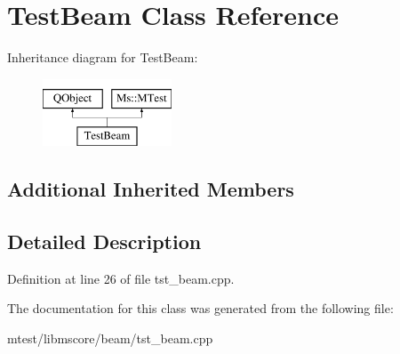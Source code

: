 \hypertarget{class_test_beam}{}\section{Test\+Beam Class Reference}
\label{class_test_beam}
Inheritance diagram for Test\+Beam\+:\begin{figure}[H]
\begin{center}
\leavevmode
\includegraphics[height=2.000000cm]{class_test_beam}
\end{center}
\end{figure}
\subsection*{Additional Inherited Members}


\subsection{Detailed Description}


Definition at line 26 of file tst\+\_\+beam.\+cpp.



The documentation for this class was generated from the following file\+:\begin{DoxyCompactItemize}
\item 
mtest/libmscore/beam/tst\+\_\+beam.\+cpp\end{DoxyCompactItemize}
